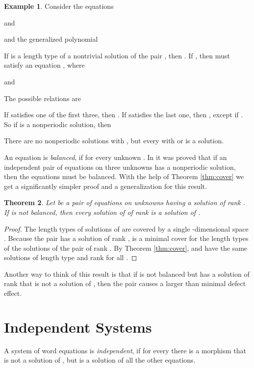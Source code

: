 \documentclass[submission]{eptcs}
\newtheorem{theorem}{Theorem}[section]
\theoremstyle{definition}
\newtheorem{example}[theorem]{Example}
\begin{document}
\begin{example}
Consider the equations

and

and the generalized polynomial

If  is a length type of a nontrivial solution of the pair , then . If , then  must satisfy an
equation , where

and

The possible relations are

If  satisfies one of the first three, then . If 
satisfies the last one, then , except if . So if
 is a nonperiodic solution, then

There are no nonperiodic solutions with , but every
 with  or  is a solution.
\end{example}

An equation  is \emph{balanced}, if  for every
unknown . In \cite{HaNo03} it was proved that if an independent
pair of equations on three unknowns has a nonperiodic solution, then
the equations must be balanced. With the help of Theorem
\ref{thm:cover} we get a significantly simpler proof and a
generalization for this result.

\begin{theorem} \label{thm:balance}
Let  be a pair of equations on  unknowns having a
solution of rank . If  is not balanced, then every
solution of  of rank  is a solution of .
\end{theorem}
\begin{proof}
The length types of solutions of  are covered by a single
-dimensional space . Because the pair  has a
solution of rank ,  is a minimal cover for the length types
of the solutions of the pair of rank . By Theorem
\ref{thm:cover},  and  have the same solutions of length
type  and rank  for all .
\end{proof}

Another way to think of this result is that if  is not balanced
but has a solution of rank  that is not a solution of ,
then the pair  causes a larger than minimal defect effect.


\section{Independent Systems} \label{sect:indsyst}

A system of word equations  is \emph{independent},
if for every  there is a morphism that is not a solution of
, but is a solution of all the other equations.
\end{document}
